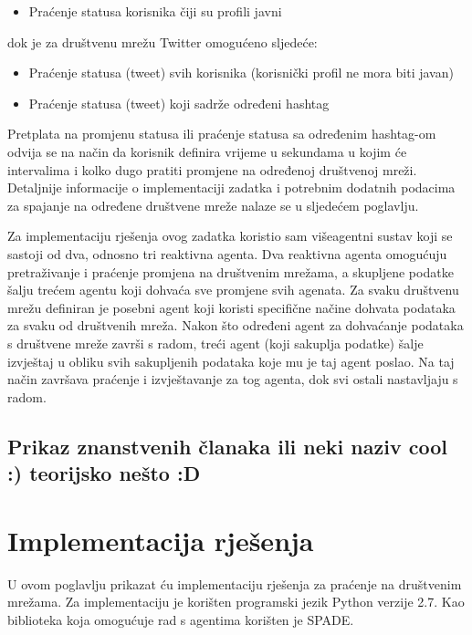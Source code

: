 \documentclass[a4paper,12pt]{foi}
\begin{document}
\begin{itemize}
\item{Praćenje statusa korisnika čiji su profili javni}
\end{itemize}
dok je za društvenu mrežu Twitter omogućeno sljedeće:
\begin{itemize}
\item{Praćenje statusa (tweet) svih korisnika (korisnički profil ne mora biti javan)}
\item{Praćenje statusa (tweet) koji sadrže određeni hashtag}
\end{itemize}

Pretplata na promjenu statusa ili praćenje statusa sa određenim hashtag-om odvija se na način da korisnik definira vrijeme u sekundama u kojim će intervalima i kolko dugo pratiti promjene na određenoj društvenoj mreži. Detaljnije informacije o implementaciji zadatka i potrebnim dodatnih podacima za spajanje na određene društvene mreže nalaze se u sljedećem poglavlju.

Za implementaciju rješenja ovog zadatka koristio sam višeagentni sustav koji se sastoji od dva, odnosno tri reaktivna agenta. Dva reaktivna agenta omogućuju pretraživanje i praćenje promjena na društvenim mrežama, a skupljene podatke šalju trećem agentu koji dohvaća sve promjene svih agenata. Za svaku društvenu mrežu definiran je posebni agent koji koristi specifične načine dohvata podataka za svaku od društvenih mreža. Nakon što određeni agent za dohvaćanje podataka s društvene mreže završi s radom, treći agent (koji sakuplja podatke) šalje izvještaj u obliku svih sakupljenih podataka koje mu je taj agent poslao. Na taj način završava praćenje i izvještavanje za tog agenta, dok svi ostali nastavljaju s radom.

\section{Prikaz znanstvenih članaka ili neki naziv cool :) teorijsko nešto :D}



\chapter{Implementacija rješenja}

U ovom poglavlju prikazat ću implementaciju rješenja za praćenje na društvenim mrežama. Za implementaciju je korišten programski jezik Python verzije 2.7. Kao biblioteka koja omogućuje rad s agentima korišten je SPADE.
\end{document}
